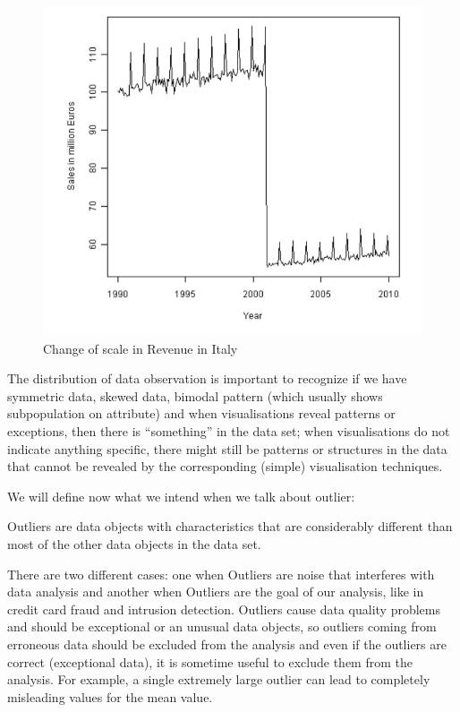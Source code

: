 \begin{figure}
    \caption{Change of scale in Revenue in Italy}
    \label{img:rescale}
    \includegraphics[width=\textwidth]{Images/rescale}
\end{figure}

The distribution of data observation is important to recognize if we have symmetric data, skewed data, bimodal
pattern (which usually shows subpopulation on attribute) and when visualisations reveal patterns or exceptions,
then there is “something” in the data set; when visualisations do not indicate anything specific,
there might still be patterns or structures in the data that cannot be revealed by the corresponding
(simple) visualisation techniques.


We will define now what we intend when we talk about outlier:
\begin{defi}
    Outliers are data objects with characteristics that are considerably different than most of the other
    data objects in the data set.
\end{defi}
There are two different cases: one when Outliers are noise that interferes with data analysis and another
when Outliers are the goal of our analysis, like in credit card fraud and intrusion detection.\newline
Outliers cause data quality problems and should be exceptional or an unusual data objects, so 
outliers coming from erroneous data should be excluded from the analysis and even if the outliers are correct
(exceptional data), it is sometime useful to exclude them from the analysis.\newline
For example, a single extremely large outlier can lead to completely misleading values for the mean value.

